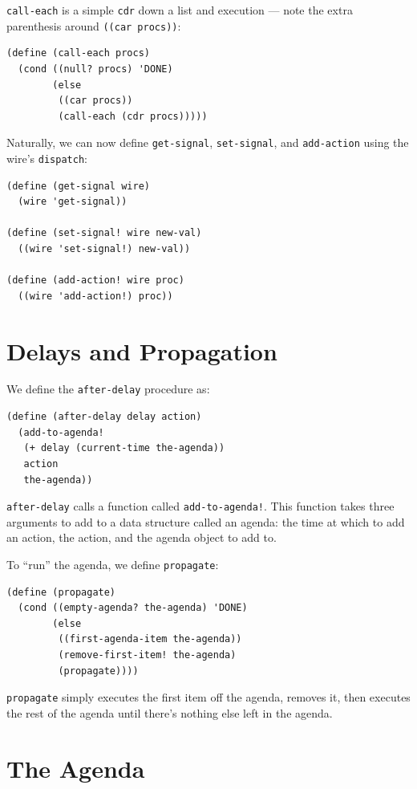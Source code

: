 \documentclass[9pt]{report}
\begin{document}
\texttt{call-each} is a simple \texttt{cdr} down a list and execution --- note the
extra parenthesis around \texttt{((car procs))}:

\begin{verbatim}
(define (call-each procs)
  (cond ((null? procs) 'DONE)
        (else
         ((car procs))
         (call-each (cdr procs)))))
\end{verbatim}

Naturally, we can now define \texttt{get-signal}, \texttt{set-signal}, and
\texttt{add-action} using the wire's \texttt{dispatch}:

\begin{verbatim}
(define (get-signal wire)
  (wire 'get-signal))

(define (set-signal! wire new-val)
  ((wire 'set-signal!) new-val))

(define (add-action! wire proc)
  ((wire 'add-action!) proc))
\end{verbatim}

\section{Delays and Propagation}
\label{sec:org13ac382}

We define the \texttt{after-delay} procedure as:

\begin{verbatim}
(define (after-delay delay action)
  (add-to-agenda!
   (+ delay (current-time the-agenda))
   action
   the-agenda))
\end{verbatim}

\texttt{after-delay} calls a function called \texttt{add-to-agenda!}. This
function takes three arguments to add to a data structure called
an agenda: the time at which to add an action, the action, and the
agenda object to add to.

To ``run'' the agenda, we define \texttt{propagate}:

\begin{verbatim}
(define (propagate)
  (cond ((empty-agenda? the-agenda) 'DONE)
        (else
         ((first-agenda-item the-agenda))
         (remove-first-item! the-agenda)
         (propagate))))
\end{verbatim}

\texttt{propagate} simply executes the first item off the agenda, removes it,
then executes the rest of the agenda until there's nothing else
left in the agenda.

\section{The Agenda}
\label{sec:org3c11413}
\end{document}
